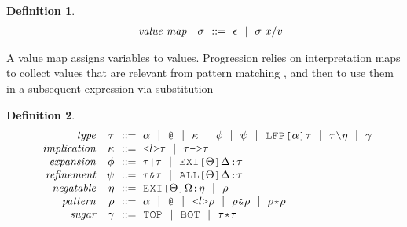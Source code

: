 \documentclass[acmsmall]{acmart}
\theoremstyle{definition}
\newtheorem{definition}{Definition}[section]
\begin{document}
\begin{definition}
  \label{def:value_map}
  \small
  \nopad
  \[\begin{array}[t]{rr@{}l}
    \com{value map} &
    \nonterm{\sigma} & \is \epsilon \sep \sigma\ x \slash v 
  \end{array}\]
\end{definition}

\noindent
A value map assigns variables to values.
Progression relies on interpretation maps to collect
values that are relevant from pattern matching ,
and then to use them in a subsequent expression via substitution 


\begin{definition}
  \label{def:type}
  \small
  \nopad
  \[\begin{array}[t]{rr@{}l}
    \com{type} &
    \nonterm{\tau} & \is 
    \begin{array}[t]{@{}l}
      \alpha \sep
      \J{@} \sep
      \kappa \sep 
      \phi \sep 
      \psi \sep 
      \J{LFP[}\alpha\J{]}\tau \sep
      \tau \typdiff \eta \sep
      \gamma
    \end{array}
    \\
    \com{implication} &
    \nonterm{\kappa} & \is 
    \begin{array}[t]{@{}l}
      \J{<} l \J{>} \tau \sep 
      \tau\J{->}\tau
    \end{array}
    \\
    \com{expansion} &
    \nonterm{\phi} & \is 
    \begin{array}[t]{@{}l}
      \tau\J{|}\tau \sep 
      \J{EXI[}\Theta\J{]} \Delta \J{:} \tau
    \end{array}
    \\
    \com{refinement} &
    \nonterm{\psi} & \is 
    \begin{array}[t]{@{}l}
      \tau\J{\&}\tau \sep 
      \J{ALL[}\Theta\J{]} \Delta \J{:} \tau
    \end{array}
    \\
    \com{negatable} &
    \nonterm{\eta} & \is 
    \begin{array}[t]{@{}l}
      \J{EXI[}\Theta \J{]} \Omega \J{:} \eta \sep 
      \rho
    \end{array}
    \\
    \com{pattern} &
    \nonterm{\rho} & \is 
    \begin{array}[t]{@{}l}
      \alpha \sep
      \J{@} \sep
      \J{<}l\J{>}\rho \sep 
      \rho\J{\&}\rho \sep
      \rho\J{*}\rho
    \end{array}
    \\
    \com{sugar} &
    \nonterm{\gamma} & \is 
    \begin{array}[t]{@{}l}
      \J{TOP} \sep \J{BOT} \sep 
      \tau \J{*} \tau 
    \end{array}
  \end{array}\]
\end{definition}
\end{document}
